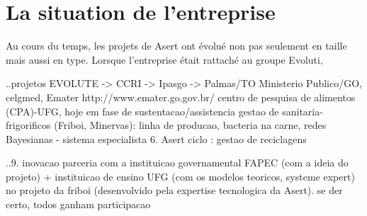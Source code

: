 

\section{La situation de l'entreprise}

Au cours du temps, les projets de Asert ont évolué non pas seulement en taille mais aussi en type. Lorsque l'entreprise était rattaché au groupe Evoluti, 



..projetos EVOLUTE -> CCRI -> Ipasgo -> Palmas/TO 
	Ministerio Publico/GO, celgmed, Emater http://www.emater.go.gov.br/
	centro de pesquisa de alimentos (CPA)-UFG, hoje em fase de sustentacao/assistencia
	gestao de sanitaria-frigorificos (Friboi, Minervas): linha de producao, bacteria na carne, redes Bayesianas - sistema especialista
6. Asert ciclo : gestao de reciclagens


..9. inovacao
	parceria com a instituicao governamental FAPEC (com a ideia do projeto) + instituicao de ensino UFG (com os modelos teoricos, systeme expert) no projeto da friboi (desenvolvido pela expertise tecnologica da Asert). se der certo, todos ganham participacao


